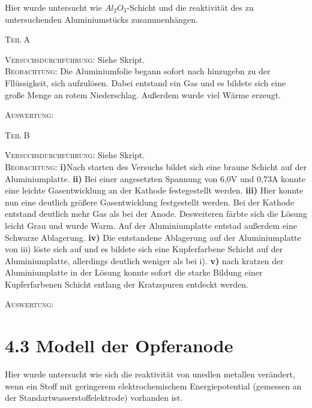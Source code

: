 \documentclass[11pt, a4paper]{article}
\begin{document}
Hier wurde untersucht wie $Al_2O_3$-Schicht und die reaktivität des zu untersuchenden Aluminiumstücks zusammenhängen.
\begin{center}
\textsc{Teil A}
\end{center}

\textsc{Versuchsdurchführung:} Siehe Skript.\\

\textsc{Beobachtung:}\hspace{5mm} Die Aluminiumfolie begann sofort nach hinzugebn zu der Fllüssigkeit, sich aufzulösen. Dabei entstand ein Gas und es bildete sich eine große Menge an rotem Niederschlag. Außerdem wurde viel Wärme erzeugt.

\textsc{Auswertung:}\hspace{8mm} 

\begin{center}
\textsc{Teil B}
\end{center}

\textsc{Versuchsdurchführung:} Siehe Skript.\\

\textsc{Beobachtung:}\hspace{5mm} \textbf{i)}Nach starten des Versuchs bildet sich eine braune Schicht auf der Aluminiumplatte. \textbf{ii)} Bei einer angesetzten Spannung von 6,0V und 0,73A konnte eine leichte Gasentwicklung an der Kathode festegestellt werden. \textbf{iii)} Hier konnte nun eine deutlich größere Gasentwicklung festgestellt werden. Bei der Kathode entstand deutlich mehr Gas als bei der Anode. Desweiteren färbte sich die Lösung leicht Grau und wurde Warm. Auf der Aluminiumplatte entstad außerdem eine Schwarze Ablagerung. \textbf{iv)} Die entstandene Ablagerung auf der Aluminiumplatte von iii) löste sich auf und es bildete sich eine Kupferfarbene Schicht auf der Aluminiumplatte, allerdings deutlich weniger als bei i). \textbf{v)} nach kratzen der Aluminiumplatte in der Lösung konnte sofort die starke Bildung einer Kupferfarbenen Schicht entlang der Kratzspuren entdeckt werden. 

\textsc{Auswertung:}\hspace{8mm} 


\newpage
\section{4.3 Modell der Opferanode}

Hier wurde untersucht wie sich die reaktivität von unedlen metallen verändert, wenn ein Stoff mit geringerem elektrochemischem Energiepotential (gemessen an der Standartwasserstoffelektrode) vorhanden ist.
 
\end{document}

